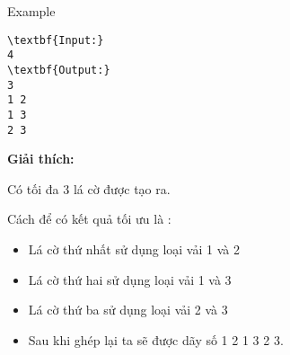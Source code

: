 Example
\begin{verbatim}
\textbf{Input:}
4
\textbf{Output:}
3
1 2
1 3
2 3\end{verbatim}




\textbf{Giải thích:}

Có tối đa 3 lá cờ được tạo ra.


Cách để có kết quả tối ưu là :
\begin{itemize}
	\item Lá cờ thứ nhất sử dụng loại vải 1 và 2
	\item Lá cờ thứ hai sử dụng loại vải 1 và 3
	\item Lá cờ thứ ba sử dụng loại vải 2 và 3
	\item Sau khi ghép lại ta sẽ được dãy số 1 2 1 3 2 3.
\end{itemize}